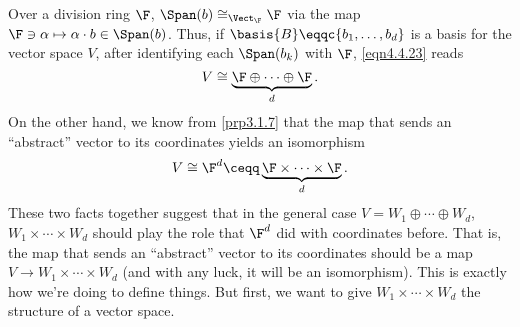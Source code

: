 Over a division ring $\F$, $\Span (b)\cong _{\Vect _{\F}}\F$ via the map $\F \ni \alpha \mapsto \alpha \cdot b\in \Span (b)$.  Thus, if $\basis{B}\eqqc \{ b_1,\ldots ,b_d\}$ is a basis for the vector space $V$, after identifying each $\Span (b_k)$ with $\F$, \eqref{eqn4.4.23} reads
\begin{equation}
	V\cong \underbrace{\F \oplus \cdots \oplus \F}_d.
\end{equation}
On the other hand, we know from \cref{prp3.1.7} that the map that sends an ``abstract'' vector to its coordinates yields an isomorphism
\begin{equation}
	V\cong \F ^d\ceqq \underbrace{\F \times \cdots \times \F}_d.
\end{equation}
These two facts together suggest that in the general case $V=W_1\oplus \cdots \oplus W_d$, $W_1\times \cdots \times W_d$ should play the role that $\F ^d$ did with coordinates before.  That is, the map that sends an ``abstract'' vector to its coordinates should be a map $V\rightarrow W_1\times \cdots \times W_d$ (and with any luck, it will be an isomorphism).  This is exactly how we're doing to define things.  But first, we want to give $W_1\times \cdots \times W_d$ the structure of a vector space.
